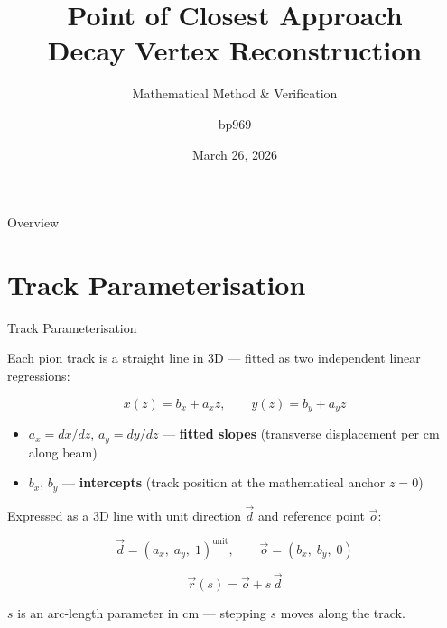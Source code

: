 \documentclass[aspectratio=169,10pt]{beamer}
\title[PoCA Vertex Reconstruction]{Point of Closest Approach\\Decay Vertex Reconstruction}
\subtitle{Mathematical Method \& Verification}
\author{bp969}
\institute{Viking / KLong}
\date{March 26, 2026}
\begin{document}
\begin{frame}
\titlepage
\end{frame}

\begin{frame}{Overview}
\tableofcontents
\end{frame}

\section{Track Parameterisation}

\begin{frame}{Track Parameterisation}

Each pion track is a straight line in 3D — fitted as two independent linear regressions:

\begin{equation*}
    x(z) = b_x + a_x z, \qquad y(z) = b_y + a_y z
\end{equation*}

\begin{itemize}
    \item $a_x = dx/dz$, $a_y = dy/dz$ \quad — \textbf{fitted slopes} (transverse displacement per cm along beam)
    \item $b_x$, $b_y$ \quad — \textbf{intercepts} (track position at the mathematical anchor $z=0$)
\end{itemize}

\medskip
Expressed as a 3D line with unit direction $\vec{d}$ and reference point $\vec{o}$:

\begin{equation*}
    \vec{d} = (a_x,\; a_y,\; 1)^{\text{unit}}, \qquad
    \vec{o} = (b_x,\; b_y,\; 0)
\end{equation*}

\begin{equation*}
    \vec{r}(s) = \vec{o} + s\,\vec{d}
\end{equation*}

$s$ is an arc-length parameter in cm — stepping $s$ moves along the track.

\end{frame}
\end{document}
